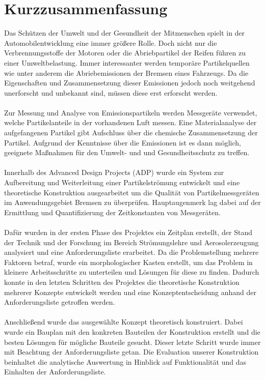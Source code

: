 \section*{Kurzzusammenfassung}
Das Sch\"{u}tzen der Umwelt und der Gesundheit der Mitmenschen spielt in der Automobilentwicklung eine immer gr\"{o}{\ss}ere Rolle. Doch nicht nur die Verbrennungsstoffe der Motoren oder die Abriebpartikel der Reifen f\"{u}hren zu einer Umweltbelastung. Immer interessanter werden tempor\"{a}re Partikelquellen wie unter anderem die Abriebemissionen der Bremsen eines Fahrzeugs. Da die Eigenschaften und Zusammensetzung dieser Emissionen jedoch noch weitgehend unerforscht und unbekannt sind, m\"{u}ssen diese erst erforscht werden. 
\\\\
Zur Messung und Analyse von Emissionspartikeln werden Messger\"{a}te verwendet, welche Partikelanteile in der vorhandenen Luft messen. Eine Materialanalyse der aufgefangenen Partikel gibt Aufschluss \"{u}ber die chemische Zusammensetzung der Partikel. Aufgrund der Kenntnisse \"{u}ber die Emissionen ist es dann m\"{o}glich, geeignete Ma{\ss}nahmen f\"{u}r den Umwelt- und und Gesundheitsschutz zu treffen.
\\\\
Innerhalb des Advanced Design Projects (ADP) wurde ein System zur Aufbereitung und Weiterleitung einer Partikelstr\"{o}mung entwickelt und eine theoretische Konstruktion ausgearbeitet um die Qualit\"{a}t von Partikelmessger\"{a}ten im Anwendungsgebiet Bremsen zu \"{u}berpr\"{u}fen. Hauptaugenmerk lag dabei auf der Ermittlung und Quantifizierung der Zeitkonstanten von Messger\"{a}ten.
\\\\
Daf\"{u}r wurden in der ersten Phase des Projektes ein Zeitplan erstellt, der Stand der Technik und der Forschung im Bereich Str\"{o}mungslehre und Aerosolerzeugung analysiert und eine Anforderungsliste erarbeitet. Da die Problemstellung mehrere Faktoren betraf, wurde ein morphologischer Kasten erstellt, um das Problem in kleinere Arbeitsschritte zu unterteilen und L\"{o}sungen f\"{u}r diese zu finden. Dadurch konnte in den letzten Schritten des Projektes die theoretische Konstruktion mehrerer Konzepte entwickelt werden und eine Konzeptentscheidung anhand der Anforderungsliste getroffen werden.
\\\\
Anschlie{\ss}end wurde das ausgew\"{a}hlte Konzept theoretisch konstruiert. Dabei wurde ein Bauplan mit den konkreten Bauteilen der Konstruktion erstellt und die besten L\"{o}sungen f\"{u}r m\"{o}gliche Bauteile gesucht. Dieser letzte Schritt wurde immer mit Beachtung der Anforderungsliste getan. Die Evaluation unserer Konstruktion beinhaltet die analytische Auswertung in Hinblick auf Funktionalit\"{a}t und das Einhalten der Anforderungsliste.